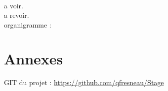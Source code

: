 \documentclass[a4paper,12pt]{extarticle}
\begin{document}
\paragraph{}
a voir.\\

a revoir.\\

organigramme :\\

\begin{center}
\end{center}

\clearpage

\section{Annexes}

GIT du projet :
\url{https://github.com/qfresneau/Stage}\\


\begin{center}
\end{center}
\end{document}
